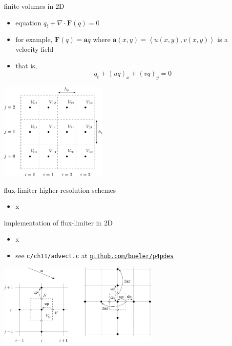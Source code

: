 \documentclass[10pt,hyperref]{beamer}
\newcommand{\ba}{\mathbf{a}}
\newcommand{\bF}{\mathbf{F}}
\newcommand{\Div}{\nabla\cdot}
\begin{document}
\begin{frame}{finite volumes in 2D}

\begin{itemize}
\item equation $q_t + \Div \bF(q) = 0$
\item for example, $\bF(q) = \ba q$ where $\ba(x,y) = \left<u(x,y), v(x,y)\right>$ is a velocity field
\item that is,
    $$q_t + (u q)_x + (v q)_y = 0$$
\end{itemize}

\hfill \includegraphics[width=0.4\textwidth]{figs/bueler11p1}
\end{frame}


\begin{frame}{flux-limiter higher-resolution schemes}

\begin{itemize}
\item x
\end{itemize}
\end{frame}


\begin{frame}{implementation of flux-limiter in 2D}

\begin{itemize}
\item x
\item see \texttt{c/ch11/advect.c} at \href{https://github.com/bueler/p4pdes}{\texttt{github.com/bueler/p4pdes}}
\end{itemize}

\begin{center}
\includegraphics[width=0.6\textwidth]{figs/bueler11p8}
\end{center}

\end{frame}
\end{document}

